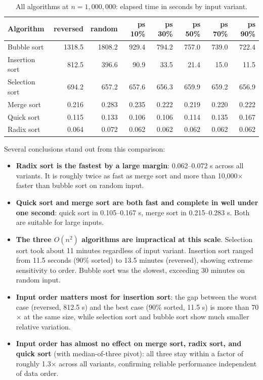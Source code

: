 \documentclass[11pt,a4paper]{article}
\begin{document}
\begin{table}[H]
\centering
\footnotesize
\begin{tabular}{lrrrrrrr}
\toprule
Algorithm & reversed & random & ps 10\% & ps 30\% & ps 50\% & ps 70\% & ps 90\% \\
\midrule
Bubble sort    & 1318.5 & 1808.2 & 929.4 & 794.2 & 757.0 & 739.0 & 722.4 \\
Insertion sort &  812.5 &  396.6 &  90.9 &  33.5 &  21.4 &  15.0 &  11.5 \\
Selection sort &  694.2 &  657.2 & 657.6 & 656.3 & 659.9 & 659.2 & 656.9 \\
Merge sort     &    0.216 &    0.283 &   0.235 &   0.222 &   0.219 &   0.220 &   0.222 \\
Quick sort     &    0.115 &    0.133 &   0.106 &   0.106 &   0.114 &   0.135 &   0.167 \\
Radix sort     &    0.064 &    0.072 &   0.062 &   0.062 &   0.062 &   0.062 &   0.062 \\
\bottomrule
\end{tabular}
\caption{All algorithms at \(n=1{,}000{,}000\): elapsed time in seconds by input variant.}
\label{tab:summary-1m}
\end{table}

Several conclusions stand out from this comparison:

\begin{itemize}
    \item \textbf{Radix sort is the fastest by a large margin}: 0.062--0.072 s across all variants. It is roughly twice as fast as merge sort and more than 10{,}000$\times$ faster than bubble sort on random input.
    \item \textbf{Quick sort and merge sort are both fast and complete in well under one second}: quick sort in 0.105--0.167 s, merge sort in 0.215--0.283 s. Both are suitable for large inputs.
    \item \textbf{The three \(O(n^2)\) algorithms are impractical at this scale}. Selection sort took about 11 minutes regardless of input variant. Insertion sort ranged from 11.5 seconds (90\% sorted) to 13.5 minutes (reversed), showing extreme sensitivity to order. Bubble sort was the slowest, exceeding 30 minutes on random input.
    \item \textbf{Input order matters most for insertion sort}: the gap between the worst case (reversed, 812.5 s) and the best case (90\% sorted, 11.5 s) is more than 70$\times$ at the same size, while selection sort and bubble sort show much smaller relative variation.
    \item \textbf{Input order has almost no effect on merge sort, radix sort, and quick sort} (with median-of-three pivot): all three stay within a factor of roughly 1.3$\times$ across all variants, confirming reliable performance independent of data order.
\end{itemize}
\end{document}
